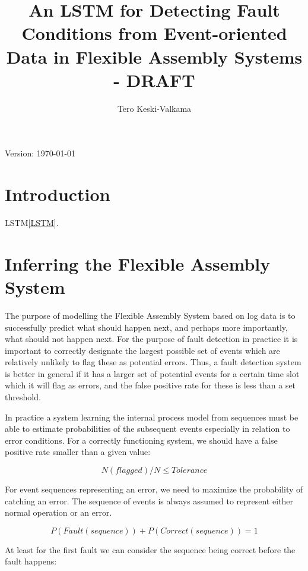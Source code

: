 \documentclass[journal]{IEEEtran}
\title{An LSTM for Detecting Fault Conditions from Event-oriented Data in Flexible Assembly Systems - DRAFT}
\author{Tero Keski-Valkama}
\begin{document}
\maketitle
Version: \today

\begin{abstract}

\end{abstract}

\begin{IEEEkeywords}
\end{IEEEkeywords}

\section{Introduction}

LSTM\ref{LSTM}.

\section{Inferring the Flexible Assembly System}

The purpose of modelling the Flexible Assembly System based on log data is to successfully predict what should happen next, and perhaps
more importantly, what should not happen next. For the purpose of fault detection in practice
it is important to correctly designate the largest possible set of events which are relatively unlikely to flag these as potential errors. Thus, a fault detection system
is better in general if it has a larger set of potential events for a certain time slot which it will flag as errors, and the false positive rate for these is less
than a set threshold.

In practice a system learning the internal process model from sequences must be able to estimate probabilities of the subsequent events especially in relation to error conditions.
For a correctly functioning system, we should have a false positive rate smaller than a given value:

$$ N(flagged) / N \leq Tolerance $$

For event sequences representing an error, we need to maximize the probability of catching an error.
The sequence of events is always assumed to represent either normal operation or an error.

$$ P(Fault(sequence)) + P(Correct(sequence)) = 1 $$

At least for the first fault we can consider the sequence being correct before the fault happens:
\end{document}
